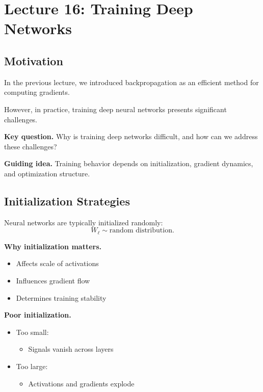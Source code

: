 \section{Lecture 16: Training Deep Networks}

\subsection{Motivation}

In the previous lecture, we introduced backpropagation as an efficient method for computing gradients.

\medskip

\noindent
However, in practice, training deep neural networks presents significant challenges.

\medskip

\noindent
\textbf{Key question.}  
Why is training deep networks difficult, and how can we address these challenges?

\medskip

\noindent
\textbf{Guiding idea.}  
Training behavior depends on initialization, gradient dynamics, and optimization structure.

\subsection{Initialization Strategies}

Neural networks are typically initialized randomly:
\[
W_\ell \sim \text{random distribution}.
\]

\medskip

\noindent
\textbf{Why initialization matters.}

\begin{itemize}
    \item Affects scale of activations
    \item Influences gradient flow
    \item Determines training stability
\end{itemize}

\medskip

\noindent
\textbf{Poor initialization.}

\begin{itemize}
    \item Too small:
    \begin{itemize}
        \item Signals vanish across layers
    \end{itemize}

    \item Too large:
    \begin{itemize}
        \item Activations and gradients explode
    \end{itemize}
\end{itemize}

